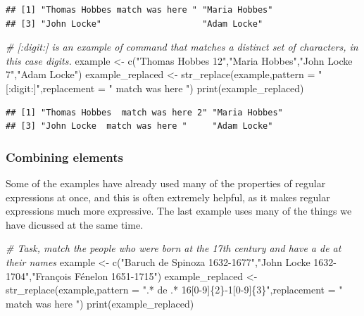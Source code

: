 \documentclass[
]{book}
\newenvironment{Shaded}{\begin{snugshade}}{\end{snugshade}}
\newcommand{\AttributeTok}[1]{\textcolor[rgb]{0.77,0.63,0.00}{#1}}
\newcommand{\CommentTok}[1]{\textcolor[rgb]{0.56,0.35,0.01}{\textit{#1}}}
\newcommand{\FunctionTok}[1]{\textcolor[rgb]{0.00,0.00,0.00}{#1}}
\newcommand{\NormalTok}[1]{#1}
\newcommand{\OtherTok}[1]{\textcolor[rgb]{0.56,0.35,0.01}{#1}}
\newcommand{\StringTok}[1]{\textcolor[rgb]{0.31,0.60,0.02}{#1}}
\begin{document}
\begin{verbatim}
## [1] "Thomas Hobbes match was here " "Maria Hobbes"                 
## [3] "John Locke"                    "Adam Locke"
\end{verbatim}

\begin{Shaded}
\begin{Highlighting}[]
\CommentTok{\# [:digit:] is an example of command that matches a distinct set of characters, in this case digits.}
\NormalTok{example }\OtherTok{\textless{}{-}} \FunctionTok{c}\NormalTok{(}\StringTok{"Thomas Hobbes 12"}\NormalTok{,}\StringTok{"Maria Hobbes"}\NormalTok{,}\StringTok{"John Locke 7"}\NormalTok{,}\StringTok{"Adam Locke"}\NormalTok{)}
\NormalTok{example\_replaced }\OtherTok{\textless{}{-}} \FunctionTok{str\_replace}\NormalTok{(example,}\AttributeTok{pattern =} \StringTok{"[:digit:]"}\NormalTok{,}\AttributeTok{replacement =} \StringTok{" match was here "}\NormalTok{)}
\FunctionTok{print}\NormalTok{(example\_replaced)}
\end{Highlighting}
\end{Shaded}

\begin{verbatim}
## [1] "Thomas Hobbes  match was here 2" "Maria Hobbes"                   
## [3] "John Locke  match was here "     "Adam Locke"
\end{verbatim}

\hypertarget{combining-elements}{%
\subsubsection{Combining elements}\label{combining-elements}}

Some of the examples have already used many of the properties of regular expressions at once, and this is often
extremely helpful, as it makes regular expressions much more expressive. The last example uses many of the things
we have dicussed at the same time.

\begin{Shaded}
\begin{Highlighting}[]
\CommentTok{\# Task, match the people who were born at the 17th century and have a de at their names}
\NormalTok{example }\OtherTok{\textless{}{-}} \FunctionTok{c}\NormalTok{(}\StringTok{"Baruch de Spinoza 1632{-}1677"}\NormalTok{,}\StringTok{"John Locke 1632{-}1704"}\NormalTok{,}\StringTok{"François Fénelon 1651{-}1715"}\NormalTok{)}
\NormalTok{example\_replaced }\OtherTok{\textless{}{-}} \FunctionTok{str\_replace}\NormalTok{(example,}\AttributeTok{pattern =} \StringTok{".* de .* 16[0{-}9]\{2\}{-}1[0{-}9]\{3\}"}\NormalTok{,}\AttributeTok{replacement =} \StringTok{" match was here "}\NormalTok{)}
\FunctionTok{print}\NormalTok{(example\_replaced)}
\end{Highlighting}
\end{Shaded}
\end{document}
